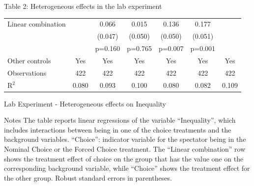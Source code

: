 \documentclass{beamer}
\begin{document}
\begin{frame}{Table 2: Heterogeneous effects in the lab experiment}
\begin{block}
\begin{table}[!htbp]
\begin{tabular}{@{\extracolsep{4pt}}lcccccc}
		Linear combination &   & 0.066 & 0.015 & 0.136 & 0.177 &  \\ 
		&  & (0.047) & (0.050) & (0.050) & (0.051) &  \\ 
		&  & p=0.160 & p=0.765 & p=0.007 & p=0.001 &  \\ 
		Other controls & Yes & Yes & Yes & Yes & Yes & Yes \\ 
		Observations & 422 & 422 & 422 & 422 & 422 & 422 \\ 
		R$^{2}$ & 0.080 & 0.093 & 0.100 & 0.080 & 0.082 & 0.109 \\ 
	\end{tabular} 
	\end{table}  
	\end{block}
	
\end{frame}
	\begin{frame}{Lab Experiment - Heterogeneous effects on Inequality}

	\begin{block}{Notes}{\small
		The table reports linear regressions of the variable “Inequality”, which includes interactions between being in one of the choice treatments and the background variables. “Choice”: indicator variable for the spectator being in the Nominal Choice or the Forced Choice treatment. The “Linear combination” row shows the treatment effect of choice on the group that has the value one on the corresponding background variable, while “Choice” shows the treatment effect for the other group. Robust standard errors in parentheses. %
}
		\end{block}
\end{frame}
\end{document}
